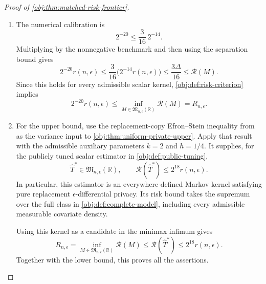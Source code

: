 \begin{proof}[Proof of \cref{obj:thm:matched-risk-frontier}]
\begin{enumerate}
In the first case take \(\eta=0\), and in the second take \(\eta=1\). The absolute loss is at least \(\Delta/2\) on the corresponding error event, so
\[
\int_{\mathbb R}|u-\eta\Delta|\,d\mathsf L_\eta(u)
\ge
\frac{\Delta}{2}\mathsf L_\eta(\mathcal E_\eta)
\ge
\frac{\Delta}{2}\frac38
=
\frac{3\Delta}{16}.
\]

Finite-prior averaging and the common target within each family give
\[
\begin{aligned}
\int_{\mathbb R}|u-\eta\Delta|\,d\mathsf L_\eta(u)
&=
\frac{1}{N_{\mathrm{prior},\eta}}
\sum_{\iota=1}^{N_{\mathrm{prior},\eta}}
E_{(P_{\eta,\iota}^{\mathrm{obs}})^{\otimes n},M}
|M(D)-\theta(P_{\eta,\iota})|\\
&\le
\frac{1}{N_{\mathrm{prior},\eta}}
\sum_{\iota=1}^{N_{\mathrm{prior},\eta}}\mathcal R(M)
=
\mathcal R(M).
\end{aligned}
\]
These identities and inequalities concern nonnegative extended integrals and remain valid when a risk is infinite. In either case,
\[
\frac{3\Delta}{16}\le\mathcal R(M).
\]

\item The numerical calibration is
\[
2^{-20}\le\frac{3}{16}\,2^{-14}.
\]
Multiplying by the nonnegative benchmark and then using the separation bound gives
\[
2^{-20}r(n,\epsilon)
\le
\frac{3}{16}\bigl(2^{-14}r(n,\epsilon)\bigr)
\le
\frac{3\Delta}{16}
\le
\mathcal R(M).
\]
Since this holds for every admissible scalar kernel, \cref{obj:def:risk-criterion} implies
\[
2^{-20}r(n,\epsilon)
\le
\inf_{M\in\mathfrak M_{n,\epsilon}(\mathbb R)}\mathcal R(M)
=
R_{n,\epsilon}.
\]

\item For the upper bound, use the replacement-copy Efron--Stein inequality from \citep[Theorem 3.1, p.~54]{BoucheronLugosiMassart2013} as the variance input to \cref{obj:thm:uniform-private-upper}. Apply that result with the admissible auxiliary parameters \(k=2\) and \(h=1/4\). It supplies, for the publicly tuned scalar estimator in \cref{obj:def:public-tuning},
\[
\widehat T^*\in\mathfrak M_{n,\epsilon}(\mathbb R),
\qquad
\mathcal R(\widehat T^*)\le2^{18}r(n,\epsilon).
\]
In particular, this estimator is an everywhere-defined Markov kernel satisfying pure replacement \(\epsilon\)-differential privacy. Its risk bound takes the supremum over the full class in \cref{obj:def:complete-model}, including every admissible measurable covariate density.

Using this kernel as a candidate in the minimax infimum gives
\[
R_{n,\epsilon}
=
\inf_{M\in\mathfrak M_{n,\epsilon}(\mathbb R)}\mathcal R(M)
\le
\mathcal R(\widehat T^*)
\le
2^{18}r(n,\epsilon).
\]
Together with the lower bound, this proves all the assertions.
\end{enumerate}
\end{proof}

